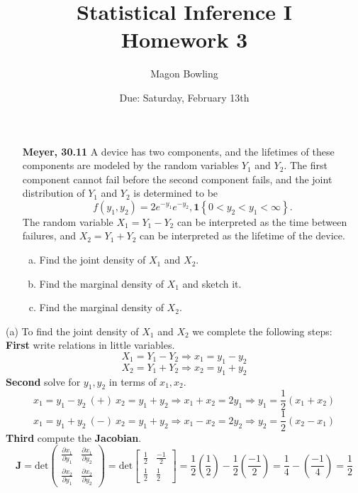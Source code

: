 \documentclass[11pt]{article}
\theoremstyle{definition}
\newcommand{\1}[1]{\mathbf{1} \left \{ #1 \right \}}
\begin{document}
\title{Statistical Inference I \\ Homework 3}
\date{Due: Saturday, February 13th}
\author{Magon Bowling}

\maketitle

\begin{itemize}
\item [{\color{red} \textbf{Meyer, 30.11}}] A device has two components, and the lifetimes of these components are modeled by the random variables $Y_1$ and $Y_2$. The first component cannot fail before the second component fails, and the joint distribution of $Y_1$ and $Y_2$ is determined to be
\[
f(y_1, y_2) = 2 e^{-y_1} e^{-y_2}, \1{0 < y_2 < y_1 < \infty}.
\]
The random variable $X_1 = Y_1 - Y_2$ can be interpreted as the time between failures, and $X_2 = Y_1 + Y_2$ can be interpreted as the lifetime of the device.
\begin{enumerate}[(a)]
\item Find the joint density of $X_1$ and $X_2$.
\item Find the marginal density of $X_1$ and sketch it.
\item Find the marginal density of $X_2$.
\end{enumerate}
\end{itemize}
(a) To find the joint density of $X_1$ and $X_2$ we complete the following steps: \\
\textbf{First} write relations in little variables.
\[X_1 = Y_1 - Y_2 \Rightarrow x_1 = y_1 - y_2\]
\[X_2 = Y_1 + Y_2 \Rightarrow x_2 = y_1 + y_2\]
\textbf{Second} solve for $y_1, y_2$ in terms of $x_1, x_2$.
\[x_1 = y_1 - y_2 \ (+) \ x_2 = y_1 + y_2 \Rightarrow x_1 + x_2 = 2y_1 \Rightarrow y_1 = \frac{1}{2}(x_1 + x_2)\]
\[x_1 = y_1 + y_2 \ (-) \ x_2 = y_1 + y_2 \Rightarrow x_1 - x_2 = 2y_2 \Rightarrow y_2 = \frac{1}{2}(x_2 - x_1)\]
\textbf{Third} compute the \textbf{Jacobian}.
\[\textbf{J} = \text{det}\begin{pmatrix}
\frac{\partial x_1}{\partial y_1} & \frac{\partial x_1}{\partial y_2} \\
\frac{\partial x_2}{\partial y_1} & \frac{\partial x_2}{\partial y_2} \end{pmatrix}
= \text{det}\begin{bmatrix}
\frac{1}{2} & \frac{-1}{2} \\
\frac{1}{2} & \frac{1}{2} \end{bmatrix}
= \frac{1}{2}\left(\frac{1}{2}\right) - \frac{1}{2}\left(\frac{-1}{2}\right) = \frac{1}{4} - \left(\frac{-1}{4}\right) = \frac{1}{2}\]
\end{document}

